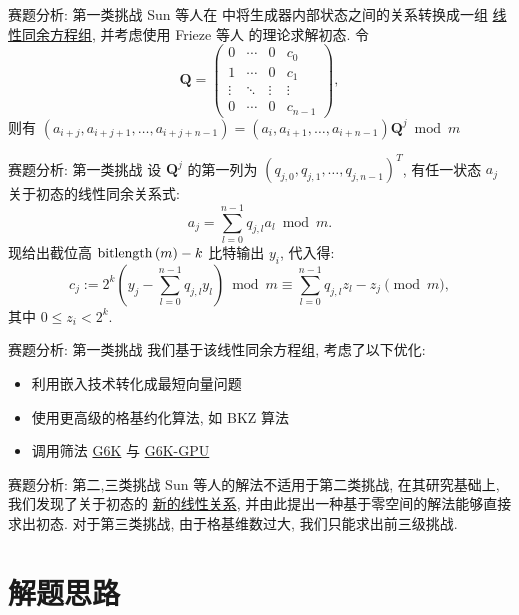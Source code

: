 \documentclass[10pt,compress]{beamer}
\newcommand{\bitlength}[1]{\ensuremath{\textnormal{bitlength}\left(#1\right)}\xspace}
\newcommand{\mat}[1]{\mathbf{#1}\xspace}
\begin{document}
\begin{frame}{赛题分析: 第一类挑战}
  Sun 等人在 \cite[Section 3.5]{Sun2020} 中将生成器内部状态之间的关系转换成一组 \underline{线性同余方程组}, 并考虑使用 Frieze 等人 \cite{Frieze1988} 的理论求解初态.
  \medbreak
  \pause
  令
  $$
  \mat{Q} = \begin{pmatrix}
    0 &\cdots &0 &c_0 \\
    1 &\cdots &0 &c_1 \\
    \vdots &\ddots &\vdots &\vdots \\
    0 &\cdots &0 &c_{n-1}
  \end{pmatrix},
  $$
  \smallbreak
  \pause
  则有 $\left(a_{i+j}, a_{i+j+1}, \ldots, a_{i+j+n-1}\right) = \left(a_i, a_{i+1}, \ldots, a_{i+n-1}\right) \mat{Q}^j \bmod{m}$
\end{frame}

\begin{frame}{赛题分析: 第一类挑战}
  设 $\mat{Q}^j$ 的第一列为 $\left(q_{j,0}, q_{j,1}, \ldots, q_{j,n-1}\right)^T$, 有任一状态 $a_j$ 关于初态的线性同余关系式:
  $$
  a_j = \sum_{l=0}^{n-1} q_{j,l} a_l \bmod{m}.
  $$
  \pause
  现给出截位高 $\bitlength{m} - k$ 比特输出 $y_i$, 代入得:
  $$
  c_j := 2^k \left(y_j - \sum_{l=0}^{n-1} q_{j,l} y_l\right) \bmod{m} \equiv \sum_{l=0}^{n-1} q_{j,l} z_l - z_j \pmod{m},
  $$
  其中 $0 \leq z_i < 2^k$.
\end{frame}

\begin{frame}{赛题分析: 第一类挑战}
  我们基于该线性同余方程组, 考虑了以下优化:
  \begin{itemize}
    \pause
    \item 利用嵌入技术转化成最短向量问题
    \pause
    \item 使用更高级的格基约化算法, 如 BKZ 算法
    \pause
    \item 调用筛法 \href{https://github.com/fplll/g6k}{G6K} 与 \href{https://github.com/WvanWoerden/G6K-GPU-Tensor}{G6K-GPU}
  \end{itemize}
\end{frame}

\begin{frame}{赛题分析: 第二,三类挑战}
  Sun 等人的解法不适用于第二类挑战, 在其研究基础上, 我们发现了关于初态的 \underline{新的线性关系}, 并由此提出一种基于零空间的解法能够直接求出初态.
  \bigbreak
  \pause
  对于第三类挑战, 由于格基维数过大, 我们只能求出前三级挑战.
\end{frame}



\section{解题思路}
\end{document}
